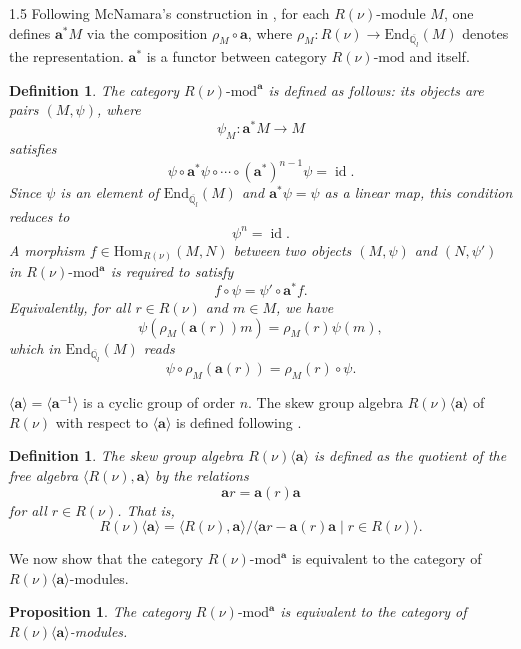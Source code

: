 \documentclass[10pt]{amsart}
\newtheorem{definition}[theorem]{Definition}
\newtheorem{proposition}[theorem]{Proposition}
\newcommand\bbq{{\mathbb Q}}
\begin{document}
\begin{spacing}{1.5}
Following McNamara's construction in \cite{https://doi.org/10.1112/jlms.12218}, for each $R(\nu)$-module $M$, one defines
$
\mathbf{a}^* M
$
via the composition $\rho_M \circ \mathbf{a}$, where $\rho_M : R(\nu) \to \mathrm{End}_{\overline{\bbq_l}}(M)$ denotes the representation. $\mathbf{a}^*$ is a functor between category $R(\nu)\text{-}\mathrm{mod}$ and itself. 
\begin{definition}
    The category $R(\nu)\text{-}\mathrm{mod}^\mathbf{a}$ is defined as follows: its objects are pairs $(M, \psi)$, where
\[
\psi_M : \mathbf{a}^* M \to M
\]
satisfies
\[
 \psi \circ \mathbf{a}^* \psi \circ \cdots \circ (\mathbf{a}^*)^{n-1} \psi= \operatorname{id}.
\]
Since $\psi$ is an element of $\mathrm{End}_{\overline{\bbq_l}}(M)$ and $\mathbf{a}^* \psi = \psi$ as a linear map, this condition reduces to
\[
\psi^n = \operatorname{id}.
\]
A morphism $f \in \mathrm{Hom}_{R(\nu)}(M, N)$ between two objects $(M, \psi)$ and $(N, \psi')$ in $R(\nu)\text{-}\mathrm{mod}^\mathbf{a}$ is required to satisfy
\[
f \circ \psi = \psi' \circ \mathbf{a}^* f.
\]
Equivalently, for all $r \in R(\nu)$ and $m \in M$, we have
\[
\psi(\rho_M(\mathbf{a}(r)) m) = \rho_M(r) \psi(m),
\]
which in $\mathrm{End}_{\overline{\bbq_l}}(M)$ reads
\[
\psi \circ \rho_M(\mathbf{a}(r)) = \rho_M(r) \circ \psi.
\]
\end{definition}
$ \langle \mathbf{a} \rangle= \langle \mathbf{a}^{-1} \rangle$ is a cyclic group of order $n.$ The skew group algebra $R(\nu)\langle\mathbf{a}\rangle$ of $R(\nu)$ with respect to $ \langle \mathbf{a} \rangle$ is defined following \cite{REITEN1985224}.
\begin{definition}
The skew group algebra $R(\nu)\langle\mathbf{a}\rangle$ is defined as the quotient of the free algebra $\langle R(\nu), \mathbf{a} \rangle$ by the relations
\[
\mathbf{a} r = \mathbf{a}(r) \mathbf{a}
\]
for all $r \in R(\nu)$. That is,
\[
R(\nu)\langle\mathbf{a}\rangle = \langle R(\nu), \mathbf{a} \rangle \big/ \langle \mathbf{a} r - \mathbf{a}(r) \mathbf{a} \mid r \in R(\nu) \rangle.
\]
\end{definition}
We now show that the category $R(\nu)\text{-}\mathrm{mod}^\mathbf{a}$ is equivalent to the category of $R(\nu)\langle\mathbf{a}\rangle$-modules.

\begin{proposition}
The category $R(\nu)\text{-}\mathrm{mod}^\mathbf{a}$ is equivalent to the category of $R(\nu)\langle\mathbf{a}\rangle$-modules.
\end{proposition}


\end{spacing}
\end{document}
